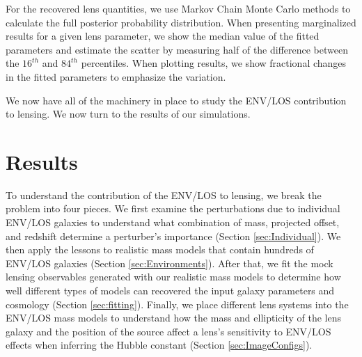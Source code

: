 \documentclass{emulateapj}
\begin{document}
For the recovered lens quantities, we use Markov Chain Monte Carlo methods to calculate the full posterior probability distribution. When presenting marginalized results for a given lens parameter, we show the median value of the fitted parameters and estimate the scatter by measuring half of the difference between the $16^{th}$ and $84^{th}$ percentiles. When plotting results, we show fractional changes in the fitted parameters to emphasize the variation.

 We now have all of the machinery in place to study the ENV/LOS contribution to lensing. We now turn to the results of our simulations.


\section{Results}

To understand the contribution of the ENV/LOS to lensing, we break the problem into four pieces. We first examine the perturbations due to individual ENV/LOS galaxies to understand what combination of mass, projected offset, and redshift determine a perturber’s importance  (Section \ref{sec:Individual}). We then apply the lessons to realistic mass models that contain hundreds of ENV/LOS galaxies (Section \ref{sec:Environments}). After that, we fit the mock lensing observables generated with our realistic mass models to determine how well different types of models can recovered the input galaxy parameters and cosmology (Section \ref{sec:fitting}). Finally, we place different lens systems into the ENV/LOS mass models to understand how the mass and ellipticity of the lens galaxy and the position of the source affect a lens's sensitivity to ENV/LOS effects when inferring the Hubble constant (Section \ref{sec:ImageConfigs}). 

\end{document}
